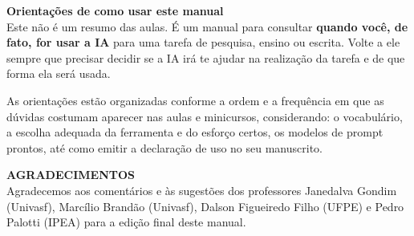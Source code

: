 \documentclass[11pt,a4paper]{article}
\begin{document}
\vspace*{0.3cm}
\begin{tcolorbox}[colback=azulUNIsuave!45,colframe=azulUNI,boxrule=0.8pt,arc=5pt,left=14pt,right=14pt,top=11pt,bottom=11pt]
{\poppins\Large\bfseries\color{azulUNI} Orientações de como usar este manual}\\[7pt]
\large
Este não é um resumo das aulas. É um manual para consultar \textbf{quando você, de fato, for usar a IA} para uma tarefa de pesquisa, ensino ou escrita. Volte a ele sempre que precisar decidir se a IA irá te ajudar na realização da tarefa e de que forma ela será usada.

\vspace{7pt}
As orientações estão organizadas conforme a ordem e a frequência em que as dúvidas costumam aparecer nas aulas e minicursos, considerando: o vocabulário, a escolha adequada da ferramenta e do esforço certos, os modelos de prompt prontos, até como emitir a declaração de uso no seu manuscrito.
\end{tcolorbox}

\vspace{14pt}
\begin{tcolorbox}[colback=cinzaSaida,colframe=verdeCodigo,boxrule=0.8pt,arc=5pt,left=14pt,right=14pt,top=10pt,bottom=10pt]
{\poppins\bfseries\small\color{verdeCodigo} AGRADECIMENTOS}\\[6pt]
\small
Agradecemos aos comentários e às sugestões dos professores Janedalva Gondim (Univasf), Marcílio Brandão (Univasf), Dalson Figueiredo Filho (UFPE) e Pedro Palotti (IPEA) para a edição final deste manual.
\end{tcolorbox}
\end{document}
